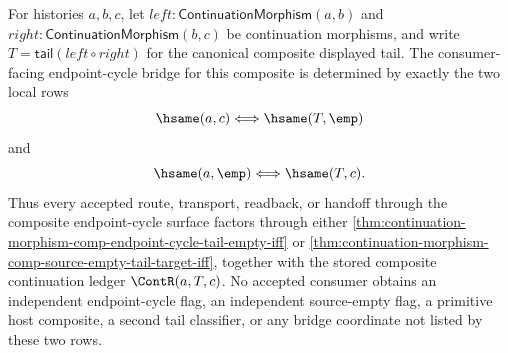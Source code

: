 \begin{lemma}
\label{lem:continuation-morphism-comp-endpoint-cycle-bridge-determinacy}
For histories $a,b,c$, let $left:\mathsf{ContinuationMorphism}(a,b)$ and
$right:\mathsf{ContinuationMorphism}(b,c)$ be continuation morphisms, and write
$T=\mathsf{tail}(left\circ right)$ for the canonical composite displayed tail.
The consumer-facing endpoint-cycle bridge for this composite is determined by
exactly the two local rows
$$
\hsame(a,c)\Longleftrightarrow\hsame(T,\emp)
$$
and
$$
\hsame(a,\emp)\Longleftrightarrow\hsame(T,c).
$$
Thus every accepted route, transport, readback, or handoff through the composite
endpoint-cycle surface factors through either
\autoref{thm:continuation-morphism-comp-endpoint-cycle-tail-empty-iff} or
\autoref{thm:continuation-morphism-comp-source-empty-tail-target-iff}, together
with the stored composite continuation ledger $\ContR(a,T,c)$. No accepted
consumer obtains an independent endpoint-cycle flag, an independent
source-empty flag, a primitive host composite, a second tail classifier, or any
bridge coordinate not listed by these two rows.
\end{lemma}
